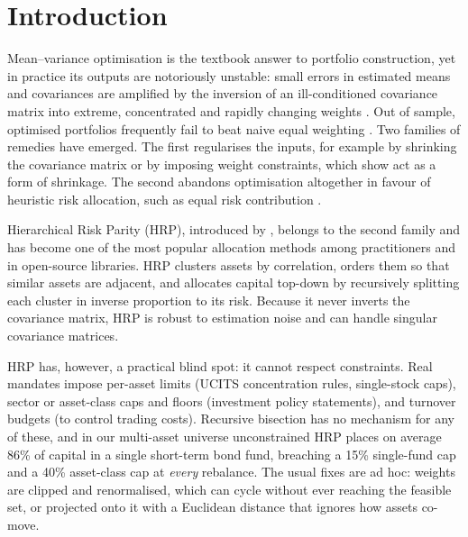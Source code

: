 \section{Introduction}\label{sec:intro}

Mean--variance optimisation \citep{markowitz1952} is the textbook answer to portfolio
construction, yet in practice its outputs are notoriously unstable: small errors in
estimated means and covariances are amplified by the inversion of an ill-conditioned
covariance matrix into extreme, concentrated and rapidly changing weights
\citep{michaud1989,chopra1993}. Out of sample, optimised portfolios frequently fail to beat
naive equal weighting \citep{demiguel2009}. Two families of remedies have emerged. The first
regularises the inputs, for example by shrinking the covariance matrix
\citep{ledoit2004} or by imposing weight constraints, which \citet{jagannathan2003} show
act as a form of shrinkage. The second abandons optimisation altogether in favour of
heuristic risk allocation, such as equal risk contribution \citep{maillard2010}.

Hierarchical Risk Parity (HRP), introduced by \citet{lopezdeprado2016}, belongs to the
second family and has become one of the most popular allocation methods among
practitioners and in open-source libraries. HRP clusters assets by correlation, orders them
so that similar assets are adjacent, and allocates capital top-down by recursively splitting
each cluster in inverse proportion to its risk. Because it never inverts the covariance
matrix, HRP is robust to estimation noise and can handle singular covariance matrices.

HRP has, however, a practical blind spot: it cannot respect constraints. Real mandates
impose per-asset limits (UCITS concentration rules, single-stock caps), sector or
asset-class caps and floors (investment policy statements), and turnover budgets (to control
trading costs). Recursive bisection has no mechanism for any of these, and in our
multi-asset universe unconstrained HRP places on average 86\% of capital in a single
short-term bond fund, breaching a 15\% single-fund cap and a 40\% asset-class cap at
\emph{every} rebalance. The usual fixes are ad hoc: weights are clipped and renormalised,
which can cycle without ever reaching the feasible set, or projected onto it with a
Euclidean distance that ignores how assets co-move.


